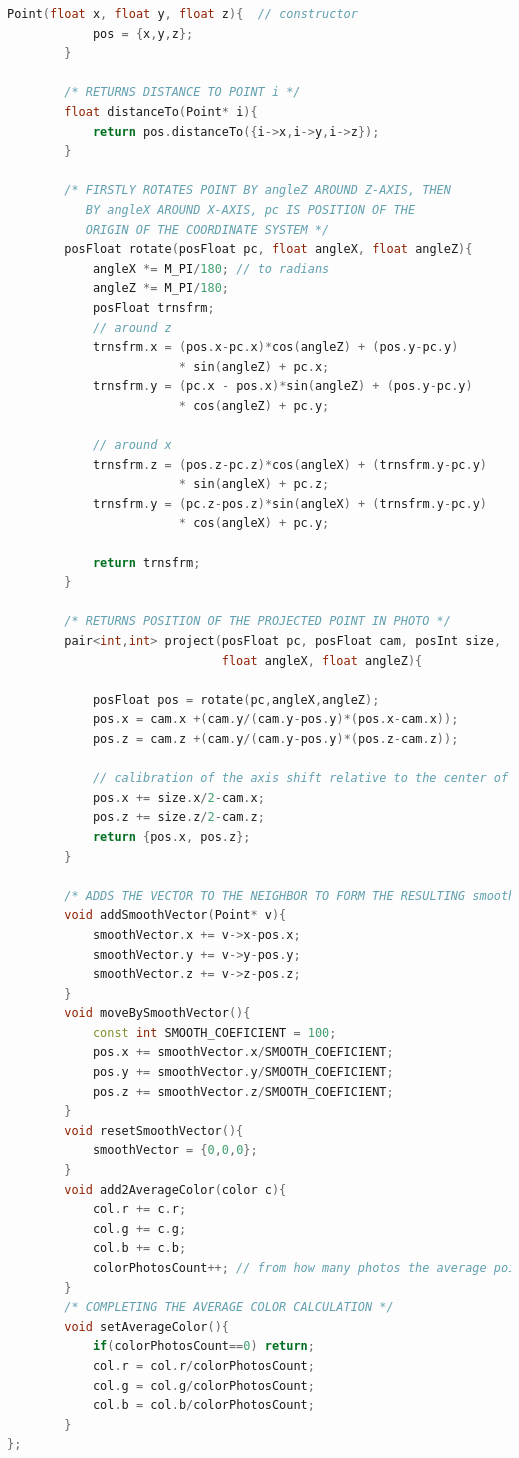 \documentclass[12pt]{report}			%
\begin{document}
\begin{appendices}
\begin{lstlisting}[language = C++]
        Point(float x, float y, float z){  // constructor
            pos = {x,y,z};
        }

        /* RETURNS DISTANCE TO POINT i */
        float distanceTo(Point* i){
            return pos.distanceTo({i->x,i->y,i->z});
        }        
        
        /* FIRSTLY ROTATES POINT BY angleZ AROUND Z-AXIS, THEN
           BY angleX AROUND X-AXIS, pc IS POSITION OF THE
           ORIGIN OF THE COORDINATE SYSTEM */
        posFloat rotate(posFloat pc, float angleX, float angleZ){
            angleX *= M_PI/180; // to radians
            angleZ *= M_PI/180;
            posFloat trnsfrm;
            // around z
            trnsfrm.x = (pos.x-pc.x)*cos(angleZ) + (pos.y-pc.y)
                        * sin(angleZ) + pc.x;
            trnsfrm.y = (pc.x - pos.x)*sin(angleZ) + (pos.y-pc.y)
                        * cos(angleZ) + pc.y;
                        
            // around x
            trnsfrm.z = (pos.z-pc.z)*cos(angleX) + (trnsfrm.y-pc.y)
                        * sin(angleX) + pc.z;
            trnsfrm.y = (pc.z-pos.z)*sin(angleX) + (trnsfrm.y-pc.y) 
                        * cos(angleX) + pc.y;
            
            return trnsfrm;
        }

        /* RETURNS POSITION OF THE PROJECTED POINT IN PHOTO */
        pair<int,int> project(posFloat pc, posFloat cam, posInt size,
                              float angleX, float angleZ){
            
            posFloat pos = rotate(pc,angleX,angleZ);
            pos.x = cam.x +(cam.y/(cam.y-pos.y)*(pos.x-cam.x));
            pos.z = cam.z +(cam.y/(cam.y-pos.y)*(pos.z-cam.z));
            
            // calibration of the axis shift relative to the center of the photo
            pos.x += size.x/2-cam.x;
            pos.z += size.z/2-cam.z;
            return {pos.x, pos.z};
        }

        /* ADDS THE VECTOR TO THE NEIGHBOR TO FORM THE RESULTING smoothVector,  v IS THE END POINT OF THE VECTOR, THE STARTING POINT IS THE CALLED ONE */
        void addSmoothVector(Point* v){ 
            smoothVector.x += v->x-pos.x;
            smoothVector.y += v->y-pos.y;
            smoothVector.z += v->z-pos.z;
        }
        void moveBySmoothVector(){
            const int SMOOTH_COEFICIENT = 100;
            pos.x += smoothVector.x/SMOOTH_COEFICIENT;
            pos.y += smoothVector.y/SMOOTH_COEFICIENT;
            pos.z += smoothVector.z/SMOOTH_COEFICIENT;
        }
        void resetSmoothVector(){
            smoothVector = {0,0,0};
        }
        void add2AverageColor(color c){
            col.r += c.r;
            col.g += c.g;
            col.b += c.b;
            colorPhotosCount++; // from how many photos the average point color is calculated 
        }
        /* COMPLETING THE AVERAGE COLOR CALCULATION */
        void setAverageColor(){
            if(colorPhotosCount==0) return;
            col.r = col.r/colorPhotosCount;
            col.g = col.g/colorPhotosCount;
            col.b = col.b/colorPhotosCount;
        }
};


\end{lstlisting}
\end{appendices}
\end{document}

